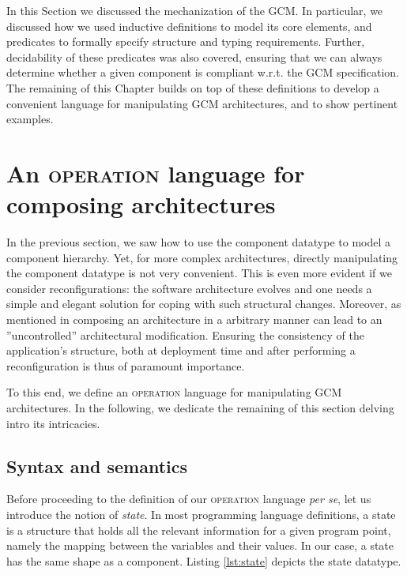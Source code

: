 		In this Section we discussed the mechanization of the \ac{GCM}. In particular, we discussed how 
	we used inductive definitions to model its core elements, and predicates to formally
	specify structure and typing requirements. Further, decidability of these predicates was also
	covered, ensuring that we can always determine whether a given component is compliant
	w.r.t. the \ac{GCM} specification. The remaining of this Chapter builds on top of these definitions 
	to develop a convenient language for manipulating  \ac{GCM} architectures, and to show
	pertinent examples.	
	

\section{An \textsc{operation} language for composing architectures}
\label{sec:op}



		In the previous section, we saw how to use the \textsf{component} datatype to model a component hierarchy.
	 Yet, for more complex architectures, directly manipulating the  \textsf{component} datatype is not very convenient.
	 This is even more evident if we consider reconfigurations: the software architecture evolves 
	 and one needs a simple and elegant solution for coping with such structural changes. Moreover,
	 as mentioned in \cite{BHN:ICAS09} composing an architecture in a arbitrary manner can lead to an 
	 ”uncontrolled” architectural modification. Ensuring the consistency of the application's structure, both at 
	 deployment time and after performing a reconfiguration is thus of paramount importance.
	 
	  To this end, we define an \textsc{operation} language for manipulating \ac{GCM} architectures.
	In the following, we dedicate the remaining of this section delving intro its intricacies.
	 

\subsection{Syntax and semantics}
\label{sub:opsem}

		
	Before proceeding to the definition of our \textsc{operation} language \textit{per se}, let us introduce
	the notion of \textit{state}.	In most programming language definitions, a state is a structure
	that holds all the relevant information for a given program point, namely the mapping between
	the variables and their values. In our case, a \textsf{state} has the same shape as a \textsf{component}.
	Listing \ref{lst:state} depicts the \textsf{state} datatype.
	

